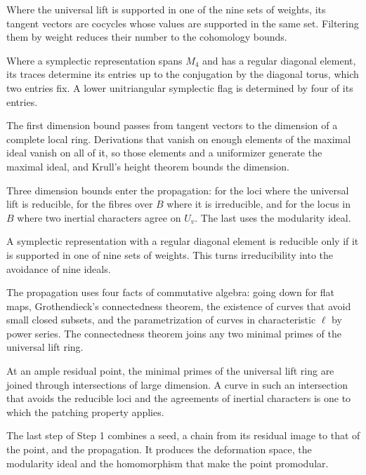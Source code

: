 Where the universal lift is supported in one of the nine sets of weights, its tangent vectors are cocycles whose values are supported in the same set. Filtering them by weight reduces their number to the cohomology bounds.

Where a symplectic representation spans $M_4$ and has a regular diagonal element, its traces determine its entries up to the conjugation by the diagonal torus, which two entries fix. A lower unitriangular symplectic flag is determined by four of its entries.

The first dimension bound passes from tangent vectors to the dimension of a complete local ring. Derivations that vanish on enough elements of the maximal ideal vanish on all of it, so those elements and a uniformizer generate the maximal ideal, and Krull's height theorem bounds the dimension.

Three dimension bounds enter the propagation: for the loci where the universal lift is reducible, for the fibres over $B$ where it is irreducible, and for the locus in $B$ where two inertial characters agree on $U_v$. The last uses the modularity ideal.

A symplectic representation with a regular diagonal element is reducible only if it is supported in one of nine sets of weights. This turns irreducibility into the avoidance of nine ideals.

The propagation uses four facts of commutative algebra: going down for flat maps, Grothendieck's connectedness theorem, the existence of curves that avoid small closed subsets, and the parametrization of curves in characteristic $\ell$ by power series. The connectedness theorem joins any two minimal primes of the universal lift ring.

At an ample residual point, the minimal primes of the universal lift ring are joined through intersections of large dimension. A curve in such an intersection that avoids the reducible loci and the agreements of inertial characters is one to which the patching property applies.

The last step of Step 1 combines a seed, a chain from its residual image to that of the point, and the propagation. It produces the deformation space, the modularity ideal and the homomorphism that make the point promodular.


